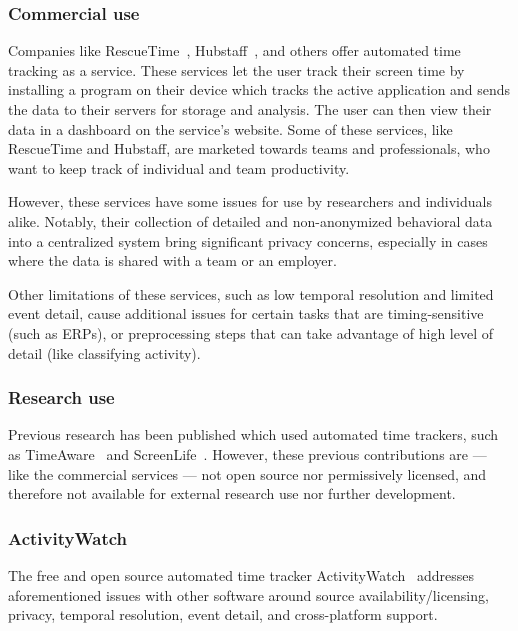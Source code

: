\documentclass{IEEEtran}
\begin{document}
\begin{refsection}
\subsubsection{Commercial use}

Companies like RescueTime~\cite{noauthor_rescuetime_nodate}, Hubstaff~\cite{noauthor_hubstaff_nodate}, and others offer automated time tracking as a service. These services let the user track their screen time by installing a program on their device which tracks the active application and sends the data to their servers for storage and analysis. The user can then view their data in a dashboard on the service's website. Some of these services, like RescueTime and Hubstaff, are marketed towards teams and professionals, who want to keep track of individual and team productivity.

However, these services have some issues for use by researchers and individuals alike. Notably, their collection of detailed and non-anonymized behavioral data into a centralized system bring significant privacy concerns, especially in cases where the data is shared with a team or an employer.

Other limitations of these services, such as low temporal resolution and limited event detail, cause additional issues for certain tasks that are timing-sensitive (such as ERPs), or preprocessing steps that can take advantage of high level of detail (like classifying activity).

\subsubsection{Research use}

Previous research has been published which used automated time trackers, such as TimeAware~\cite{kim_timeaware_2016} and ScreenLife~\cite{rooksby_personal_2016}. However, these previous contributions are --- like the commercial services --- not open source nor permissively licensed, and therefore not available for external research use nor further development.

\subsubsection{ActivityWatch}

The free and open source automated time tracker ActivityWatch~\cite{bjareholt_activitywatch_2020} addresses aforementioned issues with other software around source availability/licensing, privacy, temporal resolution, event detail, and cross-platform support.


\end{refsection}
\end{document}
